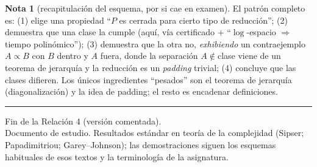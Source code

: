 \documentclass[11pt,a4paper]{article}
\theoremstyle{plain}
\theoremstyle{definition}
\newtheorem*{nota}{Nota}
\newcommand{\reduce}{\propto}
\begin{document}
\begin{nota}[recapitulaci\'on del esquema, por si cae en examen]
El patr\'on completo es: (1) elige una propiedad ``$P$ es cerrada para cierto tipo de
reducci\'on''; (2) demuestra que una clase la cumple (aqu\'i, v\'ia certificado +
``$\log$-espacio $\Rightarrow$ tiempo polin\'omico''); (3) demuestra que la otra no,
\emph{exhibiendo} un contraejemplo $A\reduce B$ con $B$ dentro y $A$ fuera, donde la
separaci\'on $A\notin$clase viene de un teorema de jerarqu\'ia y la reducci\'on es un
\emph{padding} trivial; (4) concluye que las clases difieren. Los \'unicos
ingredientes ``pesados'' son el teorema de jerarqu\'ia (diagonalizaci\'on) y la idea
de padding; el resto es encadenar definiciones.
\end{nota}

\vspace{6mm}\hrule\vspace{3mm}
\begin{center}\small
Fin de la Relaci\'on 4 (versi\'on comentada).\\[1mm]
Documento de estudio. Resultados est\'andar en teor\'ia de la complejidad
(Sipser; Papadimitriou; Garey--Johnson); las demostraciones siguen los esquemas
habituales de esos textos y la terminolog\'ia de la asignatura.
\end{center}
\end{document}
